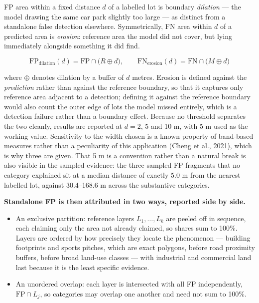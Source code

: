 FP area within a fixed distance \(d\) of a labelled lot is boundary \emph{dilation} --- the model drawing the same car park slightly too large --- as distinct from a standalone false detection elsewhere. Symmetrically, FN area within \(d\) of a predicted area is \emph{erosion}: reference area the model did not cover, but lying immediately alongside something it did find.

\[
\mathrm{FP}_{\text{dilation}}(d) = \mathrm{FP} \cap \big(R \oplus d\big), \qquad
\mathrm{FN}_{\text{erosion}}(d) = \mathrm{FN} \cap \big(M \oplus d\big)
\]

where \(\oplus\) denotes dilation by a buffer of \(d\) metres. Erosion is defined against the \emph{prediction} rather than against the reference boundary, so that it captures only reference area adjacent to a detection; defining it against the reference boundary would also count the outer edge of lots the model missed entirely, which is a detection failure rather than a boundary effect. Because no threshold separates the two cleanly, results are reported at \(d = 2\), 5 and 10 m, with 5 m used as the working value. Sensitivity to the width chosen is a known property of band-based measures rather than a peculiarity of this application (Cheng et al., 2021), which is why three are given. That 5 m is a convention rather than a natural break is also visible in the sampled evidence: the three sampled FP fragments that no category explained sit at a median distance of exactly 5.0 m from the nearest labelled lot, against 30.4--168.6 m across the substantive categories.

\textbf{Standalone FP is then attributed in two ways, reported side by side.}

\begin{itemize}
\tightlist
\item
  An exclusive partition: reference layers \(L_1,\dots,L_k\) are peeled off in sequence, each claiming only the area not already claimed, so shares sum to 100\%. Layers are ordered by how precisely they locate the phenomenon --- building footprints and sports pitches, which are exact polygons, before road proximity buffers, before broad land-use classes --- with industrial and commercial land last because it is the least specific evidence.
\item
  An unordered overlap: each layer is intersected with all FP independently, \(\mathrm{FP} \cap L_j\), so categories may overlap one another and need not sum to 100\%.
\end{itemize}

